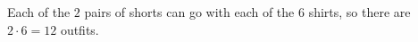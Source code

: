 Each of the $2$ pairs of shorts can go with each of the $6$ shirts, so there are $2\cdot6=\boxed{12}$ outfits.
